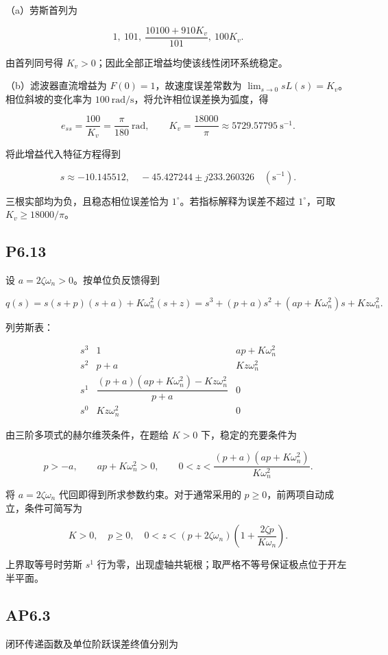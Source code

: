 \documentclass[UTF8,12pt]{ctexart}
\begin{document}
（a）劳斯首列为

\[
1,\ 101,\ \frac{10100+910K_v}{101},\ 100K_v.
\]

由首列同号得 $K_v>0$；因此全部正增益均使该线性闭环系统稳定。

（b）滤波器直流增益为 $F(0)=1$，故速度误差常数为 $\lim_{s\to0}sL(s)=K_v$。相位斜坡的变化率为 $100\ \mathrm{rad/s}$，将允许相位误差换为弧度，得

\[
e_{ss}=\frac{100}{K_v}=\frac\pi{180}\ \mathrm{rad},\qquad K_v=\frac{18000}\pi\approx5729.57795\ \mathrm{s}^{-1}.
\]

将此增益代入特征方程得到

\[
s\approx-10.145512,\quad-45.427244\pm j233.260326\quad(\mathrm{s}^{-1}).
\]

三根实部均为负，且稳态相位误差恰为 $1^\circ$。若指标解释为误差不超过 $1^\circ$，可取 $K_v\ge18000/\pi$。


\subsection*{P6.13}
设 $a=2\zeta\omega_n>0$。按单位负反馈得到

\[
q(s)=s(s+p)(s+a)+K\omega_n^2(s+z)=s^3+(p+a)s^2+(ap+K\omega_n^2)s+Kz\omega_n^2.
\]

列劳斯表：

\[
\begin{array}{c|cc}s^3&1&ap+K\omega_n^2\\s^2&p+a&Kz\omega_n^2\\s^1&\dfrac{(p+a)(ap+K\omega_n^2)-Kz\omega_n^2}{p+a}&0\\s^0&Kz\omega_n^2&0\end{array}
\]

由三阶多项式的赫尔维茨条件，在题给 $K>0$ 下，稳定的充要条件为

\[
p>-a,\qquad ap+K\omega_n^2>0,\qquad 0<z<\frac{(p+a)(ap+K\omega_n^2)}{K\omega_n^2}.
\]

将 $a=2\zeta\omega_n$ 代回即得到所求参数约束。对于通常采用的 $p\ge0$，前两项自动成立，条件可简写为

\[
K>0,\quad p\ge0,\quad 0<z<(p+2\zeta\omega_n)\left(1+\frac{2\zeta p}{K\omega_n}\right).
\]

上界取等号时劳斯 $s^1$ 行为零，出现虚轴共轭根；取严格不等号保证极点位于开左半平面。


\subsection*{AP6.3}
闭环传递函数及单位阶跃误差终值分别为
\end{document}

